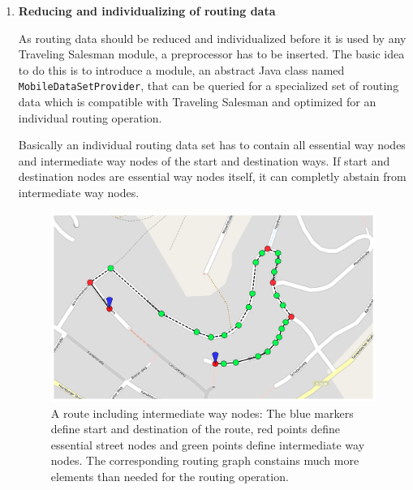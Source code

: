 \begin{enumerate}
	\item \textbf{Reducing and individualizing of routing data}

As routing data should be reduced and individualized before it is used by any Traveling Salesman module, a preprocessor has to be inserted. The basic idea to do this is to introduce a module, an abstract Java class named \texttt{MobileDataSetProvider}, that can be queried for a specialized set of routing data which is compatible with Traveling Salesman and optimized for an individual routing operation.\newline

Basically an individual routing data set has to contain all essential way nodes and intermediate way nodes of the start and destination ways. If start and destination nodes are essential way nodes itself, it can completly abstain from intermediate way nodes.\newline

\begin{figure}[h!]
	\centering
	\includegraphics[width=12cm]{pics/routing_data.png}
	\caption{A route including intermediate way nodes: The blue markers define start and destination of the route, red points define essential street nodes and green points define intermediate way nodes. The corresponding routing graph constains much more elements than needed for the routing operation.}
	\label{fig:routing_data}
\end{figure}


\end{enumerate}
